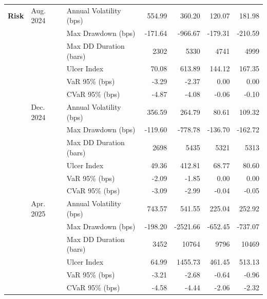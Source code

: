 \begin{table}[H]
{\begin{tabular*}{\textwidth}{@{\extracolsep{\fill}} l l l r r r r}
\textbf{Risk}
& Aug. 2024 & Annual Volatility (bps)   & 554.99  & 360.20    & 120.07   & 181.98 \\
&           & Max Drawdown (bps)        & -171.64 & -966.67   & -179.31  & -210.59 \\
&           & Max DD Duration (bars)    & 2302    & 5330      & 4741     & 4999 \\
&           & Ulcer Index               & 70.08   & 613.89    & 144.12   & 167.35 \\
&           & VaR 95\% (bps)            & -3.29   & -2.37     & 0.00     & 0.00 \\
&           & CVaR 95\% (bps)           & -4.87   & -4.08     & -0.06    & -0.10 \\
& Dec. 2024 & Annual Volatility (bps)   & 356.59  & 264.79    & 80.61    & 109.32 \\
&           & Max Drawdown (bps)        & -119.60 & -778.78   & -136.70  & -162.72 \\
&           & Max DD Duration (bars)    & 2698    & 5435      & 5321     & 5313 \\
&           & Ulcer Index               & 49.36   & 412.81    & 68.77    & 80.60 \\
&           & VaR 95\% (bps)            & -2.09   & -1.85     & 0.00     & 0.00 \\
&           & CVaR 95\% (bps)           & -3.09   & -2.99     & -0.04    & -0.05 \\
& Apr. 2025 & Annual Volatility (bps)   & 743.57   & 541.55    & 225.04    & 252.92 \\
&           & Max Drawdown (bps)        & -198.20  & -2521.66  & -652.45   & -737.07 \\
&           & Max DD Duration (bars)    & 3452     & 10764     & 9796      & 10469 \\
&           & Ulcer Index               & 64.99    & 1455.73   & 461.45    & 513.13 \\
&           & VaR 95\% (bps)            & -3.21    & -2.68     & -0.64     & -0.96 \\
&           & CVaR 95\% (bps)           & -4.58    & -4.44     & -2.06     & -2.32 \\
\midrule


\end{tabular*}}
\end{table}
